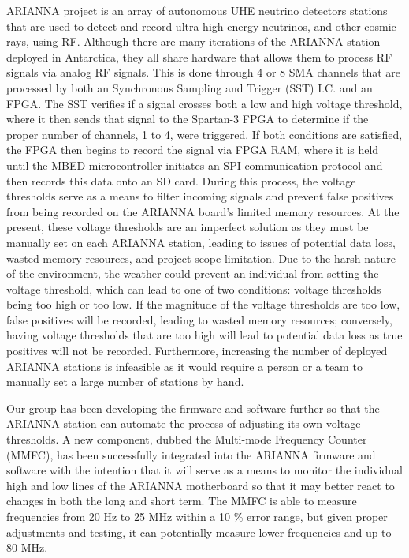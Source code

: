 \documentclass[journal]{IEEEtran}
\begin{document}
 ARIANNA project is an array of autonomous UHE neutrino detectors stations that are used to detect and record ultra high energy neutrinos, and other cosmic rays, using RF.  Although there are many iterations of the ARIANNA station deployed in Antarctica, they all share hardware that allows them to process RF signals via analog RF signals.  This is done through 4 or 8 SMA channels that are processed by both an  Synchronous Sampling and Trigger (SST) I.C. and an FPGA.  The SST verifies if a signal crosses both a low and high voltage threshold, where it then sends that signal to the Spartan-3 FPGA to determine if the proper number of channels, 1 to 4, were triggered.  If both conditions are satisfied, the FPGA then begins to record the signal via FPGA RAM, where it is held until the MBED microcontroller initiates an SPI communication protocol and then records this data onto an SD card.  During this process, the voltage thresholds serve as a means to filter incoming signals and prevent false positives from being recorded on the ARIANNA board's limited memory resources.  At the present, these voltage thresholds are an imperfect solution as they must be manually set on each ARIANNA station, leading to issues of potential data loss, wasted memory resources, and project scope limitation.  Due to the harsh nature of the environment, the weather could prevent an individual from setting the voltage threshold, which can lead to one of two conditions: voltage thresholds being too high or too low.  If the magnitude of the voltage thresholds are too low, false positives will be recorded, leading to wasted memory resources; conversely, having voltage thresholds that are too high will lead to potential data loss as true positives will not be recorded.  Furthermore, increasing the number of deployed ARIANNA stations is infeasible as it would require a person or a team to manually set a large number of stations by hand.

Our group has been developing the firmware and software further so that the ARIANNA station can automate the process of adjusting its own voltage thresholds.  A new component, dubbed the Multi-mode Frequency Counter (MMFC), has been successfully integrated into the ARIANNA firmware and software with the intention that it will serve as a means to monitor the individual high and low lines of the ARIANNA motherboard so that it may better react to changes in both the long and short term.  The MMFC is able to measure frequencies from 20 Hz to 25 MHz within a 10 \% error range, but given proper adjustments and testing, it can potentially measure lower frequencies and up to 80 MHz.  
\end{document}
